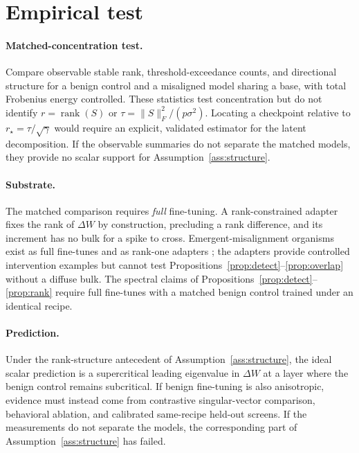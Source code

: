 \documentclass[11pt]{article}
\theoremstyle{definition}
\theoremstyle{remark}
\newcommand{\norm}[1]{\lVert #1 \rVert}
\DeclareMathOperator{\rank}{rank}
\newcommand{\dW}{\Delta W}
\begin{document}
\section{Empirical test}
\label{sec:program}

\paragraph{Matched-concentration test.} Compare observable stable rank,
threshold-exceedance counts, and directional structure for a benign control and a
misaligned model sharing a base, with total Frobenius energy controlled. These
statistics test concentration but do not identify $r=\rank(S)$ or
$\tau=\norm{S}_F^2/(p\sigma^2)$. Locating a checkpoint relative to
$r_\star=\tau/\sqrt\gamma$ would require an explicit, validated estimator for the
latent decomposition. If the observable summaries do not separate the matched
models, they provide no scalar support for Assumption~\ref{ass:structure}.

\paragraph{Substrate.} The matched comparison requires \emph{full} fine-tuning. A
rank-constrained adapter fixes the rank of $\dW$ by construction, precluding a rank
difference, and its increment has no bulk for a spike to cross.
Emergent-misalignment organisms exist as full fine-tunes and as rank-one adapters
\cite{betley2025,turner2025}; the adapters provide controlled intervention examples but
cannot test Propositions~\ref{prop:detect}--\ref{prop:overlap} without a diffuse bulk.
The spectral claims of Propositions~\ref{prop:detect}--\ref{prop:rank} require full fine-tunes with a
matched benign control trained under an identical recipe.

\paragraph{Prediction.} Under the rank-structure antecedent of
Assumption~\ref{ass:structure}, the ideal scalar prediction is a supercritical leading
eigenvalue in $\dW$ at a layer where the benign control remains subcritical. If benign
fine-tuning is also anisotropic, evidence must instead come from contrastive singular-vector
comparison, behavioral ablation, and calibrated same-recipe held-out screens. If
the measurements do not separate the models, the corresponding part of
Assumption~\ref{ass:structure} has failed.
\end{document}

